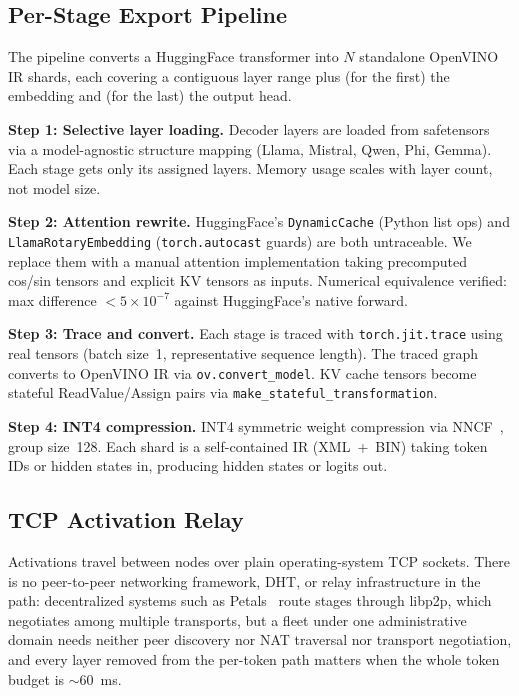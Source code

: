 \documentclass[11pt]{article}
\newcommand{\brk}{\discretionary{}{}{}}
\begin{document}
\subsection{Per-Stage Export Pipeline}
\label{sec:export}

The pipeline converts a HuggingFace transformer into $N$ standalone OpenVINO IR shards, each covering a contiguous layer range plus (for the first) the embedding and (for the last) the output head.

\textbf{Step 1: Selective layer loading.} Decoder layers are loaded from safetensors via a model-agnostic structure mapping (Llama, Mistral, Qwen, Phi, Gemma). Each stage gets only its assigned layers. Memory usage scales with layer count, not model size.

\textbf{Step 2: Attention rewrite.} HuggingFace's \texttt{DynamicCache} (Python list ops) and \texttt{Llama\brk Rotary\brk Embedding} (\texttt{torch.autocast} guards) are both untraceable. We replace them with a manual attention implementation taking precomputed cos/sin tensors and explicit KV tensors as inputs. Numerical equivalence verified: max difference $< 5 \times 10^{-7}$ against HuggingFace's native forward.

\textbf{Step 3: Trace and convert.} Each stage is traced with \texttt{torch.\brk jit.\brk trace} using real tensors (batch size~1, representative sequence length). The traced graph converts to OpenVINO IR via \texttt{ov.\brk convert\_model}. KV cache tensors become stateful ReadValue/Assign pairs via \texttt{make\_\brk stateful\_\brk transformation}.

\textbf{Step 4: INT4 compression.} INT4 symmetric weight compression via NNCF~\cite{nncf2024}, group size~128. Each shard is a self-contained IR (XML~+~BIN) taking token IDs or hidden states in, producing hidden states or logits out.

\subsection{TCP Activation Relay}
\label{sec:relay}

Activations travel between nodes over plain operating-system TCP sockets. There is no peer-to-peer networking framework, DHT, or relay infrastructure in the path: decentralized systems such as Petals~\cite{borzunov2023petals} route stages through libp2p, which negotiates among multiple transports, but a fleet under one administrative domain needs neither peer discovery nor NAT traversal nor transport negotiation, and every layer removed from the per-token path matters when the whole token budget is ${\sim}60$~ms.
\end{document}
